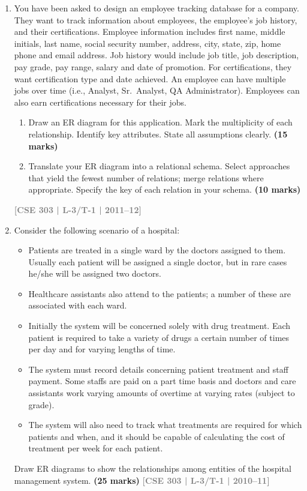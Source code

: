 \documentclass[12pt]{article}
\newcommand{\yr}[1]{\hfill\textcolor{gray}{\small\textbf{[#1]}}}
\newcommand{\mk}[1]{\textcolor{orange!70!black}{\small\textbf{(#1 marks)}}}
\begin{document}
\begin{enumerate}
Draw an Entity-Relationship (ER) diagram to represent the Library data requirements described above.
\mk{18} \yr{CSE 303 | L-3/T-1 | 2013--14}


\item You have been asked to design an employee tracking database for a company. They want to track information about employees, the employee's job history, and their certifications. Employee information includes first name, middle initials, last name, social security number, address, city, state, zip, home phone and email address. Job history would include job title, job description, pay grade, pay range, salary and date of promotion. For certifications, they want certification type and date achieved. An employee can have multiple jobs over time (i.e., Analyst, Sr.\ Analyst, QA Administrator). Employees can also earn certifications necessary for their jobs.
\begin{enumerate}
   
\item Draw an ER diagram for this application. Mark the multiplicity of each relationship. Identify key attributes. State all assumptions clearly.
\mk{15}
\item Translate your ER diagram into a relational schema. Select approaches that yield the fewest number of relations; merge relations where appropriate. Specify the key of each relation in your schema.
\mk{10}
\end{enumerate}
\yr{CSE 303 | L-3/T-1 | 2011--12}


\item Consider the following scenario of a hospital:

\begin{itemize}[leftmargin=1.5em,itemsep=2pt]
  \item Patients are treated in a single ward by the doctors assigned to them. Usually each patient will be assigned a single doctor, but in rare cases he/she will be assigned two doctors.
  \item Healthcare assistants also attend to the patients; a number of these are associated with each ward.
  \item Initially the system will be concerned solely with drug treatment. Each patient is required to take a variety of drugs a certain number of times per day and for varying lengths of time.
  \item The system must record details concerning patient treatment and staff payment. Some staffs are paid on a part time basis and doctors and care assistants work varying amounts of overtime at varying rates (subject to grade).
  \item The system will also need to track what treatments are required for which patients and when, and it should be capable of calculating the cost of treatment per week for each patient.
\end{itemize}

Draw ER diagrams to show the relationships among entities of the hospital management system.
\mk{25} \yr{CSE 303 | L-3/T-1 | 2010--11}


\end{enumerate}
\end{document}
